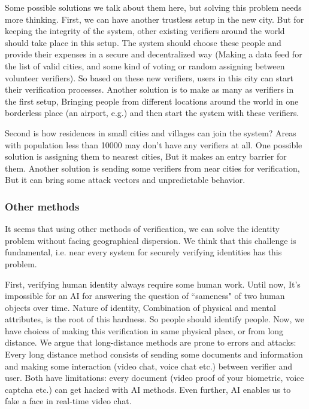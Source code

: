 \documentclass[conference]{IEEEtran}
\begin{document}
Some possible solutions we talk about them here, but solving this problem needs more thinking. First, we can have another trustless setup in the new city. But for keeping the integrity of the system, other existing verifiers around the world should take place in this setup. The system should choose these people and provide their expenses in a secure and decentralized way (Making a data feed for the list of valid cities, and some kind of voting or random assigning between volunteer verifiers). So based on these new verifiers, users in this city can start their verification processes. Another solution is to make as many as verifiers in the first setup, Bringing people from different locations around the world in one borderless place (an airport, e.g.) and then start the system with these verifiers. 


Second is how residences in small cities and villages can join the system? Areas with population less than 10000  may don't have any verifiers at all. One possible solution is assigning them to nearest cities, But it makes an entry barrier for them. Another solution is sending some verifiers from near cities for verification, But it can bring some attack vectors and unpredictable behavior. 

\subsubsection*{Other methods}
It seems that using other methods of verification, we can solve the identity problem without facing geographical dispersion. We think that this challenge is fundamental, i.e. near every system for securely verifying identities has this problem.


First, verifying human identity always require some human work. Until now, It's impossible for an AI for answering the question of ``sameness" of two human objects over time. Nature of identity, Combination of physical and mental attributes, is the root of this hardness. So people should identify people. Now, we have choices of making this verification in same physical place, or from long distance. We argue that long-distance methods are prone to errors and attacks: Every long distance method consists of sending some documents and information and making some interaction (video chat, voice chat etc.) between verifier and user. Both have limitations: every document (video proof of your biometric, voice captcha etc.) can get hacked with AI methods. Even further, AI enables us to fake a face in real-time video chat.
\end{document}
